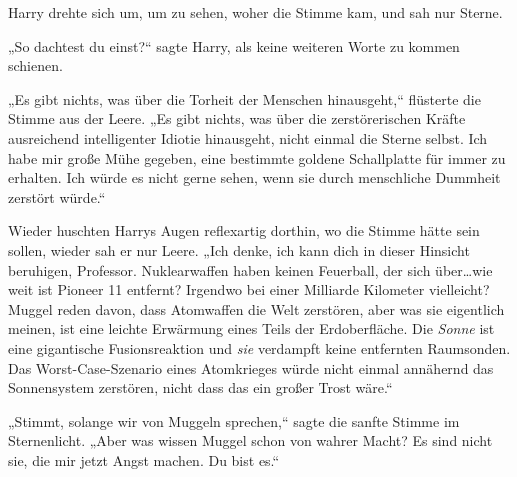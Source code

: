 Harry drehte sich um, um zu sehen, woher die Stimme kam, und sah nur Sterne.

„So dachtest du einst?“ sagte Harry, als keine weiteren Worte zu kommen schienen.

„Es gibt nichts, was über die Torheit der Menschen hinausgeht,“ flüsterte die Stimme aus der Leere. „Es gibt nichts, was über die zerstörerischen Kräfte ausreichend intelligenter Idiotie hinausgeht, nicht einmal die Sterne selbst. Ich habe mir große Mühe gegeben, eine bestimmte goldene Schallplatte für immer zu erhalten. Ich würde es nicht gerne sehen, wenn sie durch menschliche Dummheit zerstört würde.“

Wieder huschten Harrys Augen reflexartig dorthin, wo die Stimme hätte sein sollen, wieder sah er nur Leere.
„Ich denke, ich kann dich in dieser Hinsicht beruhigen, Professor. Nuklearwaffen haben keinen Feuerball, der sich über…wie weit ist Pioneer 11 entfernt? Irgendwo bei einer Milliarde Kilometer vielleicht? Muggel reden davon, dass Atomwaffen die Welt zerstören, aber was sie eigentlich meinen, ist eine leichte Erwärmung eines Teils der Erdoberfläche. Die \emph{Sonne} ist eine gigantische Fusionsreaktion und \emph{sie} verdampft keine entfernten Raumsonden. Das Worst-Case-Szenario eines Atomkrieges würde nicht einmal annähernd das Sonnensystem zerstören, nicht dass das ein großer Trost wäre.“

„Stimmt, solange wir von Muggeln sprechen,“ sagte die sanfte Stimme im Sternenlicht. „Aber was wissen Muggel schon von wahrer Macht? Es sind nicht sie, die mir jetzt Angst machen. Du bist es.“

